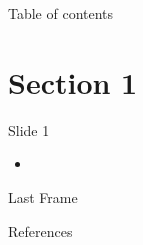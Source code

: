 \documentclass[compress,aspectratio=169]{beamer}
\begin{document}
	\begin{frame}[plain]
		\titlepage
	\end{frame}

	\begin{frame}[t]{Table of contents}
		\tableofcontents[subsectionstyle=hide/hide]
	\end{frame}


	\section{Section 1}

	\begin{frame}{Slide 1}
		\begin{itemize}
			\item
		\end{itemize}
	\end{frame}

	\begin{frame}{Last Frame}
		\label{pg:lastpage} %

	\end{frame}

	\begin{frame}{References}
		\renewcommand*{\bibfont}{\normalfont\scriptsize}
		\printbibliography[heading=none]
	\end{frame}
\end{document}
